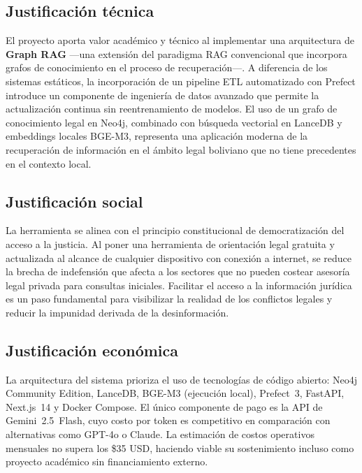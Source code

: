 \documentclass[12pt, letterpaper]{report}
\begin{document}
\subsection{Justificaci\'{o}n t\'{e}cnica}

El proyecto aporta valor acad\'{e}mico y t\'{e}cnico al implementar una arquitectura de \textbf{Graph RAG} ---una extensi\'{o}n del paradigma RAG convencional que incorpora grafos de conocimiento en el proceso de recuperaci\'{o}n---. A diferencia de los sistemas est\'{a}ticos, la incorporaci\'{o}n de un pipeline ETL automatizado con Prefect introduce un componente de ingenier\'{i}a de datos avanzado que permite la actualizaci\'{o}n continua sin reentrenamiento de modelos. El uso de un grafo de conocimiento legal en Neo4j, combinado con b\'{u}squeda vectorial en LanceDB y embeddings locales BGE-M3, representa una aplicaci\'{o}n moderna de la recuperaci\'{o}n de informaci\'{o}n en el \'{a}mbito legal boliviano que no tiene precedentes en el contexto local.

\subsection{Justificaci\'{o}n social}

La herramienta se alinea con el principio constitucional de democratizaci\'{o}n del acceso a la justicia. Al poner una herramienta de orientaci\'{o}n legal gratuita y actualizada al alcance de cualquier dispositivo con conexi\'{o}n a internet, se reduce la brecha de indefensi\'{o}n que afecta a los sectores que no pueden costear asesor\'{i}a legal privada para consultas iniciales. Facilitar el acceso a la informaci\'{o}n jur\'{i}dica es un paso fundamental para visibilizar la realidad de los conflictos legales y reducir la impunidad derivada de la desinformaci\'{o}n.

\subsection{Justificaci\'{o}n econ\'{o}mica}

La arquitectura del sistema prioriza el uso de tecnolog\'{i}as de c\'{o}digo abierto: Neo4j Community Edition, LanceDB, BGE-M3 (ejecuci\'{o}n local), Prefect~3, FastAPI, Next.js~14 y Docker Compose. El \'{u}nico componente de pago es la API de Gemini~2.5~Flash, cuyo costo por token es competitivo en comparaci\'{o}n con alternativas como GPT-4o o Claude. La estimaci\'{o}n de costos operativos mensuales no supera los \$35 USD, haciendo viable su sostenimiento incluso como proyecto acad\'{e}mico sin financiamiento externo.
\end{document}
